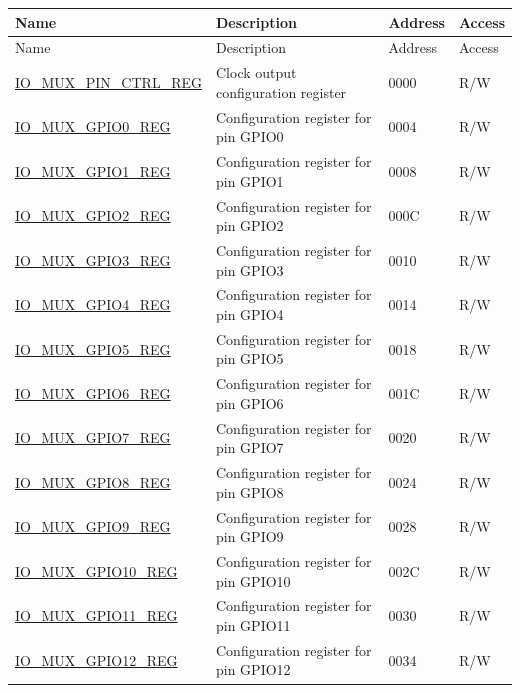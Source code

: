 \documentclass[main.tex]{subfiles}
\begin{document}
\begin{longtable}{ | p{5cm} | p{7.5cm} | p{2cm} | p{1cm} | }
\hline\rowcolor{lightgray}
Name & Description & Address & Access \\ \hline
 \hline
        \endfirsthead
        \hline
        \rowcolor{lightgray}
Name & Description & Address & Access \\
        \hline
        \endhead
        \endfoot
\hyperref[regdesc:IOMUXPINCTRL]{IO\_MUX\_PIN\_CTRL\_REG}&Clock output configuration register & \hexprefix{}0000 & R/W \\\hline
\hyperref[regdesc:IOMUXnREG]{IO\_MUX\_GPIO0\_REG} & Configuration register for pin GPIO0 & \hexprefix{}0004 & R/W\\ \hline
\hyperref[regdesc:IOMUXnREG]{IO\_MUX\_GPIO1\_REG} & Configuration register for pin GPIO1 & \hexprefix{}0008 & R/W \\ \hline
\hyperref[regdesc:IOMUXnREG]{IO\_MUX\_GPIO2\_REG} & Configuration register for pin GPIO2 & \hexprefix{}000C & R/W \\ \hline
\hyperref[regdesc:IOMUXnREG]{IO\_MUX\_GPIO3\_REG} & Configuration register for pin GPIO3 & \hexprefix{}0010 & R/W \\ \hline
\hyperref[regdesc:IOMUXnREG]{IO\_MUX\_GPIO4\_REG} & Configuration register for pin GPIO4 & \hexprefix{}0014 & R/W\\ \hline
\hyperref[regdesc:IOMUXnREG]{IO\_MUX\_GPIO5\_REG} & Configuration register for pin GPIO5 & \hexprefix{}0018 & R/W \\ \hline
\hyperref[regdesc:IOMUXnREG]{IO\_MUX\_GPIO6\_REG} & Configuration register for pin GPIO6 & \hexprefix{}001C &R/W \\ \hline
\hyperref[regdesc:IOMUXnREG]{IO\_MUX\_GPIO7\_REG} & Configuration register for pin GPIO7 & \hexprefix{}0020 & R/W \\ \hline
\hyperref[regdesc:IOMUXnREG]{IO\_MUX\_GPIO8\_REG} & Configuration register for pin GPIO8 & \hexprefix{}0024 & R/W \\ \hline
\hyperref[regdesc:IOMUXnREG]{IO\_MUX\_GPIO9\_REG} & Configuration register for pin GPIO9 & \hexprefix{}0028 & R/W \\ \hline
\hyperref[regdesc:IOMUXnREG]{IO\_MUX\_GPIO10\_REG} & Configuration register for pin GPIO10 & \hexprefix{}002C & R/W \\ \hline
\hyperref[regdesc:IOMUXnREG]{IO\_MUX\_GPIO11\_REG} & Configuration register for pin GPIO11 & \hexprefix{}0030 & R/W \\ \hline
\hyperref[regdesc:IOMUXnREG]{IO\_MUX\_GPIO12\_REG} & Configuration register for pin GPIO12 & \hexprefix{}0034 & R/W \\ \hline

\end{longtable}
\end{document}
